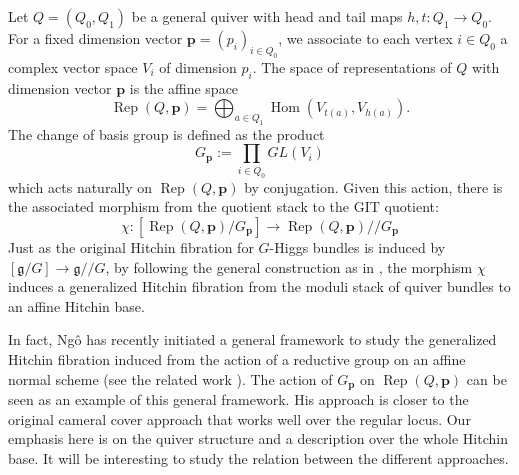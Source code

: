\documentclass[11pt]{amsart}
\theoremstyle{plain}
\theoremstyle{definition}
\theoremstyle{remark}
\begin{document}
Let $Q=(Q_0, Q_1)$ be a general quiver with head and tail maps $h,t:Q_1\to Q_0$. For a fixed dimension vector $\bm{p}=(p_i)_{i\in Q_0}$, we associate to each vertex $i\in Q_0$ a complex vector space $V_i$ of dimension $p_i$. The space of representations of $Q$ with dimension vector $\bm{p}$ is the affine space 
\[ \operatorname{Rep}(Q,\bm{p})= \bigoplus_{a\in Q_1} \operatorname{Hom}(V_{t(a)}, V_{h(a)}). \]
The change of basis group is defined as the product
\[ G_{\bm{p}}:= \prod_{i\in Q_0}GL(V_i)\]
which acts naturally on $\operatorname{Rep}(Q,\bm{p})$ by conjugation. Given this action, there is the associated morphism from the quotient stack to the GIT quotient: 
\[\chi: \left[ \operatorname{Rep}(Q, \bm{p})/G_{\bm{p}} \right] \to \operatorname{Rep}(Q, \bm{p})/\!/G_{\bm{p}} \] 
Just as the original Hitchin fibration for $G$-Higgs bundles is induced by $\left[\mathfrak{g}/G\right] \to \mathfrak{g}/\!/G$, by following the general construction as in \cite{ngo2006fibration,ngo2010lemme}, the morphism $\chi$ induces a generalized Hitchin fibration from the moduli stack of quiver bundles to an affine Hitchin base. 

In fact, Ng\^{o} has recently initiated a general framework to study the generalized Hitchin fibration induced from the action of a reductive group on an affine normal scheme (see the related work \cite{hameister}). The action of $G_{\bm{p}}$ on $\operatorname{Rep}(Q,\bm{p})$ can be seen as an example of this general framework. His approach is closer to the original cameral cover approach that works well over the regular locus. Our emphasis here is on the quiver structure and a description over the whole Hitchin base. It will be interesting to study the relation between the different approaches. 


\printbibliography
\end{document}
